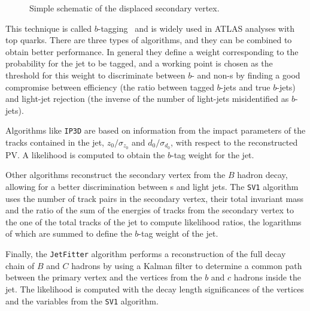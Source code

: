 \begin{figure}[tb]\begin{center}
	\caption{Simple schematic of the displaced secondary vertex.\label{fig:btagvtx}}
\end{center}\end{figure}

This technique is called $b$-tagging~\cite{ref:ATLAS-CONF-2011-102} and is
widely used in ATLAS analyses with top quarks. There are three types of algorithms,
and they can be combined to obtain better performance. In general they define a weight
corresponding to the probability for the jet to be tagged, and a working point is chosen
as the threshold for this weight to discriminate between $b$- and non-\bjet s
by finding a good compromise between efficiency (the ratio between tagged
$b$-jets and true $b$-jets) and light-jet rejection
(the inverse of the number of light-jets misidentified as $b$-jets).

Algorithms like \texttt{IP3D} are
based on information from the impact parameters of the tracks
contained in the jet, $z_0/\sigma_{z_0}$ and $d_0/\sigma_{d_0}$,
with respect to the reconstructed PV. 
A likelihood is computed to
obtain the $b$-tag weight for the jet.

Other algorithms reconstruct the secondary vertex from the $B$ hadron
decay, allowing for a better discrimination between \bjet s and light
jets. The \texttt{SV1} algorithm uses the number of track pairs in
the secondary vertex, their total invariant mass and the ratio of
the sum of the energies of tracks from the secondary vertex to the one
of the total tracks of the jet to compute likelihood ratios, the logarithms
of which are summed to define the $b$-tag weight of the jet.

Finally, the \texttt{JetFitter} algorithm performs a reconstruction
of the full decay chain of $B$ and $C$ hadrons by using a Kalman filter to determine a 
common path between the primary vertex and the vertices from the $b$ and $c$ hadrons 
inside the jet. The likelihood is computed with the decay length significances
of the vertices and the variables from the  \texttt{SV1} algorithm.

